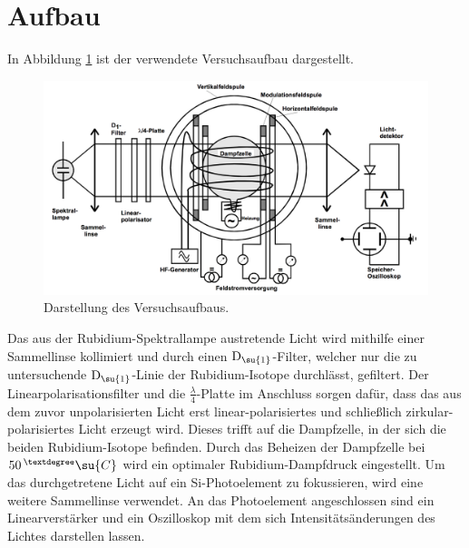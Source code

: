 
\newpage
\section{Aufbau}
In Abbildung \ref{fig:aufbau} ist der verwendete Versuchsaufbau dargestellt.
\begin{figure}
    \centering
    \includegraphics[scale = 0.4]{pictures/aufbau.png}
    \caption{Darstellung des Versuchsaufbaus.\cite{1}}
    \label{fig:aufbau}
\end{figure}
\newline
Das aus der Rubidium-Spektrallampe austretende Licht wird mithilfe einer Sammellinse kollimiert und durch einen $\text{D}_{\su{1}}$-Filter,
welcher nur die zu untersuchende $\text{D}_{\su{1}}$-Linie der Rubidium-Isotope durchlässt, gefiltert.
Der Linearpolarisationsfilter und die $\frac{\lambda}{4}$-Platte im Anschluss sorgen dafür, dass das
aus dem zuvor unpolarisierten Licht erst linear-polarisiertes und schließlich zirkular-polarisiertes Licht erzeugt wird.
Dieses trifft auf die Dampfzelle, in der sich die beiden Rubidium-Isotope befinden.
Durch das Beheizen der Dampfzelle bei $50\,^{°}\su{C}$ wird ein optimaler Rubidium-Dampfdruck
eingestellt. Um das durchgetretene Licht auf ein Si-Photoelement zu fokussieren, wird
eine weitere Sammellinse verwendet. An das Photoelement angeschlossen sind ein Linearverstärker
und ein Oszilloskop mit dem sich Intensitätsänderungen des Lichtes darstellen lassen.

